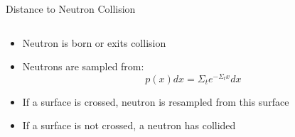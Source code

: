 \documentclass[serif]{beamer}
\begin{document}
\begin{frame}{Distance to Neutron Collision}
\begin{columns}
\begin{column}{0.5\linewidth}
  \begin{itemize}
    \item {Neutron is born or exits collision}\vfill
    \item {Neutrons are sampled from:
    \[ p(x)dx = \Sigma_t e^{-\Sigma_t x}dx\]}
    \vfill
    \item {\only<3>{\color{red}}If a surface is crossed}, {neutron is resampled from this surface}\vfill
    \item {If a surface is not crossed, a neutron has collided}
  \end{itemize}

\end{column}
\end{columns}

\end{frame}

\end{document}
